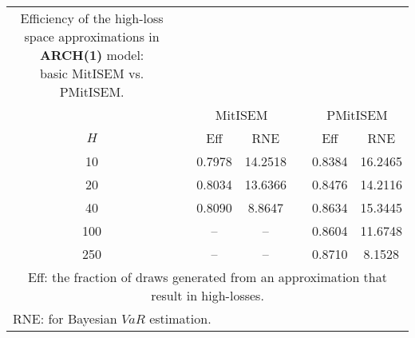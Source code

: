 { \renewcommand{\arraystretch}{1.2} 
\begin{longtable}{cc cc c cc} 
\caption{Efficiency of the high-loss space approximations in \textbf{ARCH(1)} model:\\ basic MitISEM vs. PMitISEM.} 
\label{tab:effarch} \\ 
 && \multicolumn{2}{c}{MitISEM} && \multicolumn{2}{c}{PMitISEM} \\ \cline{3-4} \cline{6-7} 
 $H$ && Eff  & RNE && Eff & RNE  \\ \cline{1-1} \cline{3-4} \cline{6-7} 
10 & &0.7978 &  14.2518 && 0.8384 &  16.2465 \\ [1ex] 
20 & &0.8034 &  13.6366 && 0.8476 &  14.2116 \\ [1ex] 
40 & &0.8090 &  8.8647 && 0.8634 &  15.3445 \\ [1ex] 
100 & &-- & -- && 0.8604 &  11.6748 \\ [1ex] 
250 & &-- & -- && 0.8710 &  8.1528 \\ [1ex] 
\hline 
\multicolumn{7}{p{7cm}}{\footnotesize{Eff: the fraction of draws generated from an approximation that result in high-losses.}}  \\ 
\multicolumn{7}{l}{\footnotesize{RNE: for Bayesian $VaR$ estimation.}} 
\end{longtable} 
} 
